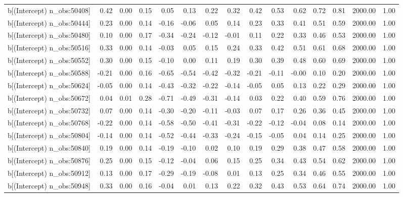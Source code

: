 \begin{table}[ht]
\begin{tabular}{rrrrrrrrrrrrrrr}
  b[(Intercept) n\_obs:50408] & 0.42 & 0.00 & 0.15 & 0.05 & 0.13 & 0.22 & 0.32 & 0.42 & 0.53 & 0.62 & 0.72 & 0.81 & 2000.00 & 1.00 \\ 
  b[(Intercept) n\_obs:50444] & 0.23 & 0.00 & 0.14 & -0.16 & -0.06 & 0.05 & 0.14 & 0.23 & 0.33 & 0.41 & 0.51 & 0.59 & 2000.00 & 1.00 \\ 
  b[(Intercept) n\_obs:50480] & 0.10 & 0.00 & 0.17 & -0.34 & -0.24 & -0.12 & -0.01 & 0.11 & 0.22 & 0.33 & 0.46 & 0.53 & 2000.00 & 1.00 \\ 
  b[(Intercept) n\_obs:50516] & 0.33 & 0.00 & 0.14 & -0.03 & 0.05 & 0.15 & 0.24 & 0.33 & 0.42 & 0.51 & 0.61 & 0.68 & 2000.00 & 1.00 \\ 
  b[(Intercept) n\_obs:50552] & 0.30 & 0.00 & 0.15 & -0.10 & 0.00 & 0.11 & 0.19 & 0.30 & 0.39 & 0.48 & 0.60 & 0.69 & 2000.00 & 1.00 \\ 
  b[(Intercept) n\_obs:50588] & -0.21 & 0.00 & 0.16 & -0.65 & -0.54 & -0.42 & -0.32 & -0.21 & -0.11 & -0.00 & 0.10 & 0.20 & 2000.00 & 1.00 \\ 
  b[(Intercept) n\_obs:50624] & -0.05 & 0.00 & 0.14 & -0.43 & -0.32 & -0.22 & -0.14 & -0.05 & 0.05 & 0.13 & 0.22 & 0.29 & 2000.00 & 1.00 \\ 
  b[(Intercept) n\_obs:50672] & 0.04 & 0.01 & 0.28 & -0.71 & -0.49 & -0.31 & -0.14 & 0.03 & 0.22 & 0.40 & 0.59 & 0.76 & 2000.00 & 1.00 \\ 
  b[(Intercept) n\_obs:50732] & 0.07 & 0.00 & 0.14 & -0.30 & -0.20 & -0.11 & -0.03 & 0.07 & 0.17 & 0.26 & 0.36 & 0.45 & 2000.00 & 1.00 \\ 
  b[(Intercept) n\_obs:50768] & -0.22 & 0.00 & 0.14 & -0.58 & -0.50 & -0.41 & -0.31 & -0.22 & -0.12 & -0.04 & 0.08 & 0.14 & 2000.00 & 1.00 \\ 
  b[(Intercept) n\_obs:50804] & -0.14 & 0.00 & 0.14 & -0.52 & -0.44 & -0.33 & -0.24 & -0.15 & -0.05 & 0.04 & 0.14 & 0.25 & 2000.00 & 1.00 \\ 
  b[(Intercept) n\_obs:50840] & 0.19 & 0.00 & 0.14 & -0.19 & -0.10 & 0.02 & 0.10 & 0.19 & 0.29 & 0.38 & 0.47 & 0.58 & 2000.00 & 1.00 \\ 
  b[(Intercept) n\_obs:50876] & 0.25 & 0.00 & 0.15 & -0.12 & -0.04 & 0.06 & 0.15 & 0.25 & 0.34 & 0.43 & 0.54 & 0.62 & 2000.00 & 1.00 \\ 
  b[(Intercept) n\_obs:50912] & 0.13 & 0.00 & 0.17 & -0.29 & -0.19 & -0.08 & 0.01 & 0.13 & 0.25 & 0.34 & 0.46 & 0.55 & 2000.00 & 1.00 \\ 
  b[(Intercept) n\_obs:50948] & 0.33 & 0.00 & 0.16 & -0.04 & 0.01 & 0.13 & 0.22 & 0.32 & 0.43 & 0.53 & 0.64 & 0.74 & 2000.00 & 1.00 \\ 

\end{tabular}
\end{table}
